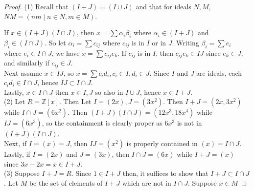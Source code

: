 \documentclass[reqno]{amsart}
\theoremstyle{definition}
\theoremstyle{remark}
\begin{document}
\begin{proof}
    (1) Recall that
    $\left( I+J \right) = 
    \left( I \cup J \right) $ and that
    for ideals $N,M$, 
    $NM = \left( nm  \mid n \in N, m \in M \right) $.

    If $x \in \left( I+J \right) \left( I \cap J \right) $, then
    $x = \sum \alpha_i \beta_i$ where
    $\alpha_i \in \left( I+J \right) $ and
    $\beta_i \in \left( I \cap J \right) $.
    So let $\alpha_i = \sum c_{ij}$ where
    $c_{ij}$ is in $I$ or in $J$. Writing
    $\beta_i = \sum e_i$ where
    $e_i \in I \cap J$, we have
    $x = \sum c_{ij} e_k$. If
    $c_{ij}$ is in $I$, then
    $c_{ij} e_k \in IJ$ since
    $e_k \in J$, and similarly if  $c_{ij} \in J$.\\
    \linebreak
    Next assume $x \in IJ$, so
    $x = \sum c_i d_i, c_i \in I, d_i \in J$.
    Since $I$ and $J$ are ideals, 
    each $c_i d_i \in I \cap J$, hence
    $IJ \subset I \cap J$.\\
    \linebreak
    Lastly, 
    $x \in I \cap J$ then
    $x \in I,J$ so also in
    $I \cup  J$, hence
    $x \in  I + J$.\\
    \linebreak
    (2) Let $R = \mathbb{Z}[x]$. Then
    Let $I = (2x), J = (3x^2)$. Then
    $I + J = (2x, 3x^2)$ while
    $I \cap J = \left( 6x^2 \right) $. 
    Then 
    $\left( I+J \right) 
    \left( I \cap J \right) 
    = \left( 12 x^3,18x^{4} \right) $ while
    $IJ = \left( 6x^3 \right) $, so the containment
    is clearly proper as
    $6x^3$ is not in
    $\left( I+J \right) \left( I \cap J \right) $.\\
    Next, if $I = (x) = J$, then
    $IJ = (x^2)$ is properly contained in
    $(x) = I \cap J$.\\
    Lastly, if $I = (2x)$ and
    $J = (3x)$, then
    $I \cap J = (6x)$ while
    $I + J = (x)$ since
    $3x - 2x = x \in I + J$.\\
    \linebreak
    (3) Suppose $I + J = R$. Since
    $1 \in I + J$ then, it suffices to show
    that $I + J \subset I \cap J$.
    Let
    $M$ be the set of elements of $I+J$ which
    are not in $I \cap J$. Suppose
    $x \in M$
\end{proof}
\end{document}
